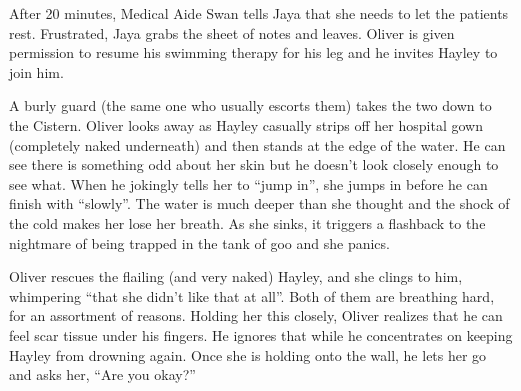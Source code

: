 After 20 minutes, Medical Aide Swan tells Jaya that she needs to let the patients rest.  Frustrated, Jaya grabs the sheet of notes and leaves.  Oliver is given permission to resume his swimming therapy for his leg and he invites Hayley to join him.



A burly guard (the same one who usually escorts them) takes the two down to the Cistern.  Oliver looks away as Hayley casually strips off her hospital gown (completely naked underneath) and then stands at the edge of the water.  He can see there is something odd about her skin but he doesn't look closely enough to see what.  When he jokingly tells her to ``jump in'', she jumps in before he can finish with ``slowly''.  The water is much deeper than she thought and the shock of the cold makes her lose her breath.  As she sinks, it triggers a flashback to the nightmare of being trapped in the tank of goo and she panics.



Oliver rescues the flailing (and very naked) Hayley, and she clings to him, whimpering ``that she didn't like that at all''.  Both of them are breathing hard, for an assortment of reasons.  Holding her this closely, Oliver realizes that he can feel scar tissue under his fingers.  He ignores that while he concentrates on keeping Hayley from drowning again.  Once she is holding onto the wall, he lets her go and asks her, ``Are you okay?''



